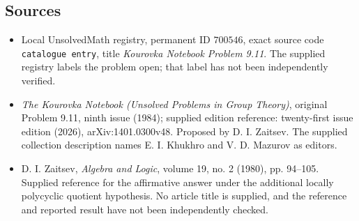 \documentclass[11pt]{article}
\begin{document}
\subsection{Sources}
\begin{itemize}
\item Local UnsolvedMath registry, permanent ID \(700546\), exact source code \texttt{catalogue entry}, title \emph{Kourovka Notebook Problem 9.11}. The supplied registry labels the problem open; that label has not been independently verified.
\item \emph{The Kourovka Notebook (Unsolved Problems in Group Theory)}, original Problem 9.11, ninth issue (1984); supplied edition reference: twenty-first issue edition (2026), arXiv:1401.0300v48. Proposed by D. I. Zaitsev. The supplied collection description names E. I. Khukhro and V. D. Mazurov as editors.
\item D. I. Zaitsev, \emph{Algebra and Logic}, volume 19, no. 2 (1980), pp. 94--105. Supplied reference for the affirmative answer under the additional locally polycyclic quotient hypothesis. No article title is supplied, and the reference and reported result have not been independently checked.
\end{itemize}
\end{document}
